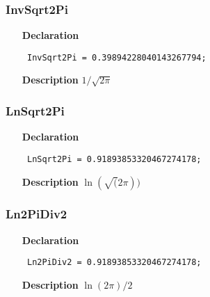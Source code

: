 \documentclass[12pt,a4paper,oneside]{report}
\newcommand{\declarationitem}[1]{\textbf{#1}}
\newcommand{\descriptiontitle}[1]{\textbf{#1}}
\newcommand{\code}[1]{\texttt{#1}}
\begin{document}
\subsubsection{InvSqrt2Pi}
\label{utypes-InvSqrt2Pi}
\begin{itemize}\item[\declarationitem{Declaration}\hfill]
	\begin{flushleft}
		\code{
			InvSqrt2Pi = 0.39894228040143267794;}
		
	\end{flushleft}
	
	\par
	\item[\descriptiontitle{Description}]
	$1/\sqrt{2\pi}$
	
\end{itemize}
\subsubsection{LnSqrt2Pi}
\label{utypes-LnSqrt2Pi}
\begin{itemize}\item[\declarationitem{Declaration}\hfill]
	\begin{flushleft}
		\code{
			LnSqrt2Pi  = 0.91893853320467274178;}
		
	\end{flushleft}
	
	\par
	\item[\descriptiontitle{Description}]
	$\ln(\sqrt(2\pi))$
	
\end{itemize}
\subsubsection{Ln2PiDiv2}
\label{utypes-Ln2PiDiv2}
\begin{itemize}\item[\declarationitem{Declaration}\hfill]
	\begin{flushleft}
		\code{
			Ln2PiDiv2  = 0.91893853320467274178;}
		
	\end{flushleft}
	
	\par
	\item[\descriptiontitle{Description}]
	$\ln(2\pi)/2$
	
\end{itemize}
\end{document}
